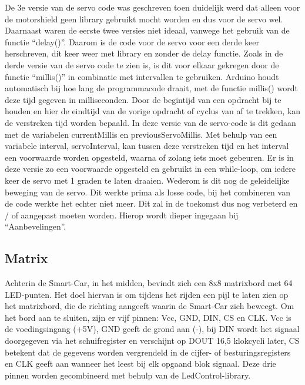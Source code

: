 De 3e versie van de servo code was geschreven toen duidelijk werd dat alleen voor de motorshield geen library gebruikt mocht worden en dus voor de servo wel. Daarnaast waren de eerste twee versies niet ideaal, vanwege het gebruik van de functie “delay()”. Daarom is de code voor de servo voor een derde keer herschreven, dit keer weer met library en zonder de delay functie\cite{Functie-millis-info}. 
Zoals in de derde versie van de servo code te zien is, is dit voor elkaar gekregen door de functie “millis()” in combinatie met intervallen te gebruiken. Arduino\cite{ArduinoMEGA} houdt automatisch bij hoe lang de programmacode draait, met de functie millis() wordt deze tijd gegeven in milliseconden. Door de begintijd van een opdracht bij te houden en hier de eindtijd van de vorige opdracht of cyclus van af te trekken, kan de verstreken tijd worden bepaald. In deze versie van de servo-code is dit gedaan met de variabelen 
currentMillis en previousServoMillis. Met behulp van een variabele interval, servoInterval, kan tussen deze verstreken tijd en het interval een voorwaarde worden opgesteld, waarna of zolang iets moet gebeuren. Er is in deze versie zo een voorwaarde opgesteld en gebruikt in een while-loop, om iedere keer de servo met 1 graden te laten draaien. Wederom is dit nog de geleidelijke beweging van de servo.
Dit werkte prima als losse code, bij het combineren van de code werkte het echter niet meer. Dit zal in de toekomst dus nog verbeterd en / of aangepast moeten worden. Hierop wordt dieper ingegaan bij “Aanbevelingen”.


\subsection{Matrix}
Achterin de \gls{Smart-Car}, in het midden, bevindt zich een 8x8 matrixbord met 64 LED-punten. Het doel hiervan is om tijdens het rijden een pijl te laten zien op het matrixbord, die de richting aangeeft waarin de \gls{Smart-Car} zich beweegt. Om het bord aan te sluiten, zijn er vijf pinnen: Vcc, GND, DIN, CS en CLK. Vcc is de voedingsingang (+5V), GND geeft de grond aan (-), bij DIN wordt het signaal doorgegeven via het schuifregister en verschijnt op DOUT 16,5 klokcycli later, CS betekent dat de gegevens worden vergrendeld in de cijfer- of besturingsregisters en CLK geeft aan wanneer het leest bij elk opgaand blok signaal. Deze drie pinnen worden gecombineerd met behulp van de LedControl-library.

